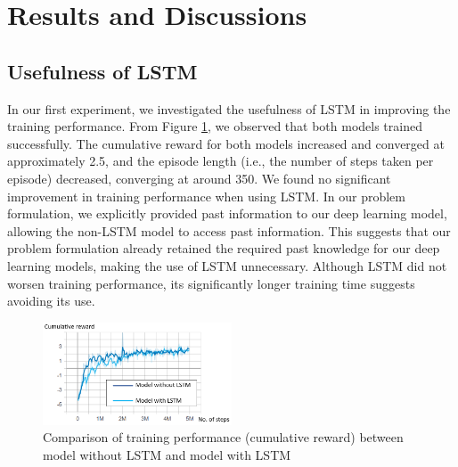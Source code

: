 \documentclass{article}
\begin{document}
\section{Results and Discussions}\label{ref:results}
\subsection{Usefulness of LSTM}
In our first experiment, we investigated the usefulness of LSTM in improving the training performance. From Figure \ref{fig2}, we observed that both models trained successfully. The cumulative reward for both models increased and converged at approximately 2.5, and the episode length (i.e., the number of steps taken per episode) decreased, converging at around 350. We found no significant improvement in training performance when using LSTM. In our problem formulation, we explicitly provided past information to our deep learning model, allowing the non-LSTM model to access past information. This suggests that our problem formulation already retained the required past knowledge for our deep learning models, making the use of LSTM unnecessary. Although LSTM did not worsen training performance, its significantly longer training time suggests avoiding its use.

\begin{figure}[!tb]
\centering
\includegraphics[width=0.5\textwidth]{images/fig1.png}
\caption{Comparison of training performance (cumulative reward) between model without LSTM and model with LSTM}\label{fig2}
\end{figure}

\end{document}
